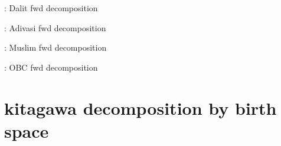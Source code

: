 \documentclass{article}
\begin{document}
\begin{table}[H]
    \centering
    \footnotesize %
    \caption{: Dalit fwd decomposition}
    \label{tab:sumstat}
\end{table}

\begin{table}[H]
    \centering
    \footnotesize %
    \caption{: Adivasi fwd decomposition}
    \label{tab:sumstat}
\end{table}



\begin{table}[H]
    \centering
    \footnotesize %
    \caption{: Muslim fwd decomposition}
    \label{tab:sumstat}
\end{table}

\begin{table}[H]
    \centering
    \footnotesize %
    \caption{: OBC fwd decomposition}
    \label{tab:sumstat}
\end{table}

\section{kitagawa decomposition by birth space}



\end{document}
